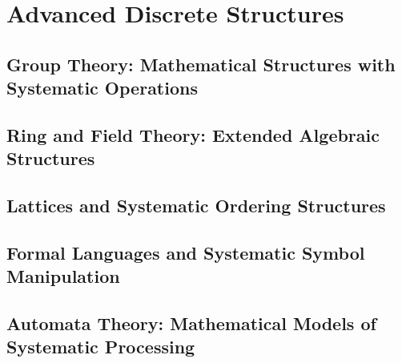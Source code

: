 

\chapter{Advanced Discrete Structures}

\section{Group Theory: Mathematical Structures with Systematic Operations}

\section{Ring and Field Theory: Extended Algebraic Structures}

\section{Lattices and Systematic Ordering Structures}

\section{Formal Languages and Systematic Symbol Manipulation}

\section{Automata Theory: Mathematical Models of Systematic Processing}
